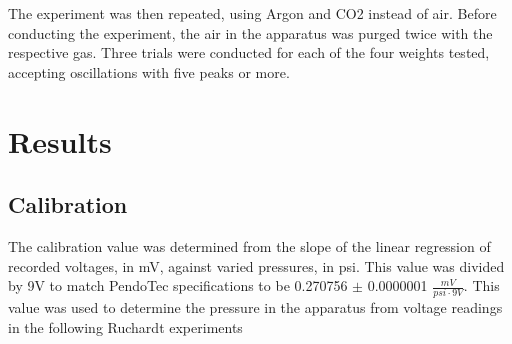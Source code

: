 \documentclass[lettersize,journal]{IEEEtran}
\begin{document}
	The experiment was then repeated, using Argon and CO2 instead of air. Before conducting the experiment, the air in the apparatus was purged twice with the respective gas. Three trials were conducted for each of the four weights tested, accepting oscillations with five peaks or more.
	\section{Results}
	\subsection{Calibration}
	The calibration value was determined from the slope of the linear regression of recorded voltages, in mV, against varied pressures, in psi. This value was divided by 9V to match PendoTec specifications  to be 0.270756 $\pm$ 0.0000001 $\frac{mV}{psi\cdot9V}$. This value was used to determine the pressure in the apparatus from voltage readings in the following Ruchardt experiments
	
\end{document}
